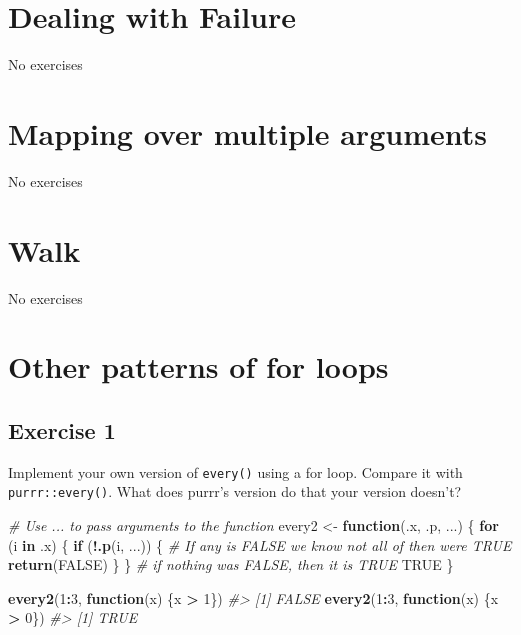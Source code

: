 \documentclass[]{book}
\newenvironment{Shaded}{\begin{snugshade}}{\end{snugshade}}
\newcommand{\CommentTok}[1]{\textcolor[rgb]{0.56,0.35,0.01}{\textit{#1}}}
\newcommand{\ControlFlowTok}[1]{\textcolor[rgb]{0.13,0.29,0.53}{\textbf{#1}}}
\newcommand{\DecValTok}[1]{\textcolor[rgb]{0.00,0.00,0.81}{#1}}
\newcommand{\KeywordTok}[1]{\textcolor[rgb]{0.13,0.29,0.53}{\textbf{#1}}}
\newcommand{\NormalTok}[1]{#1}
\newcommand{\OperatorTok}[1]{\textcolor[rgb]{0.81,0.36,0.00}{\textbf{#1}}}
\newcommand{\OtherTok}[1]{\textcolor[rgb]{0.56,0.35,0.01}{#1}}
\newcommand{\StringTok}[1]{\textcolor[rgb]{0.31,0.60,0.02}{#1}}
\theoremstyle{plain}
\theoremstyle{remark}
\theoremstyle{definition}
\theoremstyle{definition}
\theoremstyle{definition}
\theoremstyle{remark}
\begin{document}
\hypertarget{dealing-with-failure}{%
\section{Dealing with Failure}\label{dealing-with-failure}}

No exercises

\hypertarget{mapping-over-multiple-arguments}{%
\section{Mapping over multiple
arguments}\label{mapping-over-multiple-arguments}}

No exercises

\hypertarget{walk}{%
\section{Walk}\label{walk}}

No exercises

\hypertarget{other-patterns-of-for-loops}{%
\section{Other patterns of for
loops}\label{other-patterns-of-for-loops}}

\hypertarget{exercise-1-61}{%
\subsection{Exercise 1}\label{exercise-1-61}}

Implement your own version of \texttt{every()} using a for loop. Compare
it with \texttt{purrr::every()}. What does purrr's version do that your
version doesn't?

\begin{Shaded}
\begin{Highlighting}[]
\CommentTok{# Use ... to pass arguments to the function}
\NormalTok{every2 <-}\StringTok{ }\ControlFlowTok{function}\NormalTok{(.x, .p, ...) \{}
  \ControlFlowTok{for}\NormalTok{ (i }\ControlFlowTok{in}\NormalTok{ .x) \{}
    \ControlFlowTok{if}\NormalTok{ (}\OperatorTok{!}\KeywordTok{.p}\NormalTok{(i, ...)) \{}
      \CommentTok{# If any is FALSE we know not all of then were TRUE}
      \KeywordTok{return}\NormalTok{(}\OtherTok{FALSE}\NormalTok{)}
\NormalTok{    \}}
\NormalTok{  \}}
  \CommentTok{# if nothing was FALSE, then it is TRUE}
  \OtherTok{TRUE}  
\NormalTok{\}}

\KeywordTok{every2}\NormalTok{(}\DecValTok{1}\OperatorTok{:}\DecValTok{3}\NormalTok{, }\ControlFlowTok{function}\NormalTok{(x) \{x }\OperatorTok{>}\StringTok{ }\DecValTok{1}\NormalTok{\})}
\CommentTok{#> [1] FALSE}
\KeywordTok{every2}\NormalTok{(}\DecValTok{1}\OperatorTok{:}\DecValTok{3}\NormalTok{, }\ControlFlowTok{function}\NormalTok{(x) \{x }\OperatorTok{>}\StringTok{ }\DecValTok{0}\NormalTok{\})}
\CommentTok{#> [1] TRUE}
\end{Highlighting}
\end{Shaded}
\end{document}
